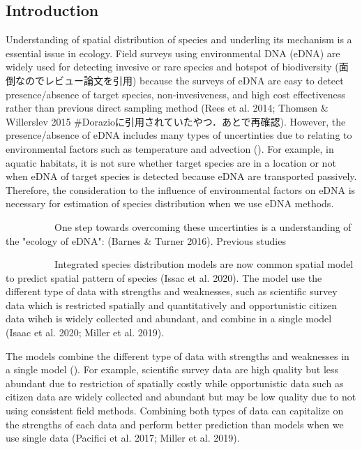 \documentclass[12pt]{article}
\begin{document}
\newpage
\begin{linenumbers}
\section{Introduction}
Understanding of spatial distribution of species and underling its mechanism is a essential issue in ecology.
Field surveys using environmental DNA (eDNA) are widely used for detecting invesive or rare species and hotspot of biodiversity (面倒なのでレビュー論文を引用) because the surveys of eDNA are easy to detect presence/absence of target species, non-invesiveness, and high cost effectiveness rather than previous direct sampling method (Rees et al. 2014; Thomsen \& Willerslev 2015 #Dorazioに引用されていたやつ．あとで再確認).
However, the presence/absence of eDNA includes many types of uncertinties due to relating to environmental factors such as temperature and advection ().
For example, in aquatic habitats, it is not sure whether target species are in a location or not when eDNA of target species is detected because eDNA are transported passively.
Therefore, the consideration to the influence of environmental factors on eDNA is necessary for estimation of species distribution when we use eDNA methods.

\ \ \ \ \ \ \ \ \ \
One step towards overcoming these uncertinties is a understanding of the "ecology of eDNA":  (Barnes \& Turner 2016). Previous studies

\ \ \ \ \ \ \ \ \ \
Integrated species distribution models are now common spatial model to predict spatial pattern of species (Issac et al. 2020).
The model use the different type of data with strengths and weaknesses, such as scientific survey data which is restricted spatially and quantitatively and opportunistic citizen data wihch is widely collected and abundant, and combine in a single model (Isaac et al. 2020; Miller et al. 2019).

The models combine the different type of data with strengths and weaknesses in a single model ().
For example, scientific survey data are high quality but less abundant due to restriction of spatially costly while opportunistic data such as citizen data are widely collected and abundant but may be low quality due to not using consistent field methods.
Combining both types of data can capitalize on the strengths of each data and perform better prediction than models when we use single data (Pacifici et al. 2017; Miller et al. 2019).



\end{linenumbers}
\end{document}
